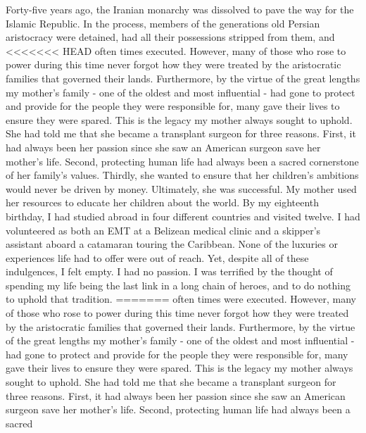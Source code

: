\documentclass[10pt]{article}
\begin{document}
\author{Armon Shariati}
\title{}
\date{}
\maketitle

Forty-five years ago, the Iranian monarchy was dissolved to pave the way for
the Islamic Republic. In the process, members of the generations old Persian
aristocracy were detained, had all their possessions stripped from them, and
<<<<<<< HEAD
often times executed. However, many of those who rose to power during this time
never forgot how they were treated by the aristocratic families that governed
their lands. Furthermore, by the virtue of the great lengths my mother's family
- one of the oldest and most influential - had gone to protect and provide for
the people they were responsible for, many gave their lives to ensure they were
spared. This is the legacy my mother always sought to uphold. She had told me
that she became a transplant surgeon for three reasons. First, it had always
been her passion since she saw an American surgeon save her mother's life.
Second, protecting human life had always been a sacred cornerstone of her
family's values. Thirdly, she wanted to ensure that her children's ambitions
would never be driven by money. Ultimately, she was successful. My mother used
her resources to educate her children about the world.  By my eighteenth
birthday, I had studied abroad in four different countries and visited twelve.
I had volunteered as both an EMT at a Belizean medical clinic and a skipper's
assistant aboard a catamaran touring the Caribbean.  None of the luxuries or
experiences life had to offer were out of reach. Yet, despite all of these
indulgences, I felt empty. I had no passion.  I was terrified by the thought of
spending my life being the last link in a long chain of heroes, and to do
nothing to uphold that tradition.
=======
often times were executed. However, many of those who rose to power during this
time never forgot how they were treated by the aristocratic families that
governed their lands. Furthermore, by the virtue of the great lengths my
mother's family - one of the oldest and most influential - had gone to protect
and provide for the people they were responsible for, many gave their lives to
ensure they were spared. This is the legacy my mother always sought to uphold.
She had told me that she became a transplant surgeon for three reasons. First,
it had always been her passion since she saw an American surgeon save her
mother's life.  Second, protecting human life had always been a sacred
\end{document}
